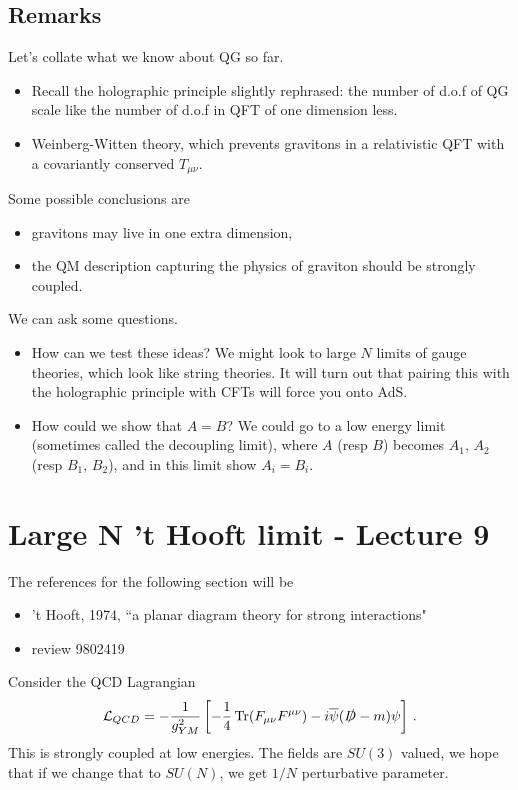 \documentclass{article}
\begin{document}
\subsection{Remarks}
Let's collate what we know about QG so far. 
\begin{itemize}
	\item Recall the holographic principle slightly rephrased: the number of d.o.f of QG scale like the number of d.o.f in QFT of one dimension less. 
	\item Weinberg-Witten theory, which prevents gravitons in a relativistic QFT with a covariantly conserved $T_{\mu\nu}$. 
\end{itemize}
Some possible conclusions are 
\begin{itemize}
	\item gravitons may live in one extra dimension, 
	\item the QM description capturing the physics of graviton should be strongly coupled. 
\end{itemize}
We can ask some questions. 
\begin{itemize}
	\item How can we test these ideas? We might look to large $N$ limits of gauge theories, which look like string theories. It will turn out that pairing this with the holographic principle with CFTs will force you onto AdS. 
	\item How could we show that $A=B$? We could go to a low energy limit (sometimes called the decoupling limit), where $A$ (resp $B$) becomes $A_1, \, A_2$ (resp $B_1, \, B_2$), and in this limit show $A_i = B_i$. 
\end{itemize}

\section{Large N 't Hooft limit - Lecture 9}
The references for the following section will be 
\begin{itemize}
	\item 't Hooft, 1974, ``a planar diagram theory for strong interactions"
	\item review 9802419
\end{itemize}
Consider the QCD Lagrangian 
\[
\mathcal{L}_{QCD} = -\frac{1}{g_{YM}^2} \left[ -\frac{1}{4}\operatorname{Tr} (F_{\mu\nu}F^{\mu\nu}) - i \overline{\psi}(\slashed{D}-m) \psi \right] \, .
\]
This is strongly coupled at low energies. The fields are $SU(3)$ valued, we hope that if we change that to $SU(N)$, we get $1/N$ perturbative parameter. 
\end{document}
